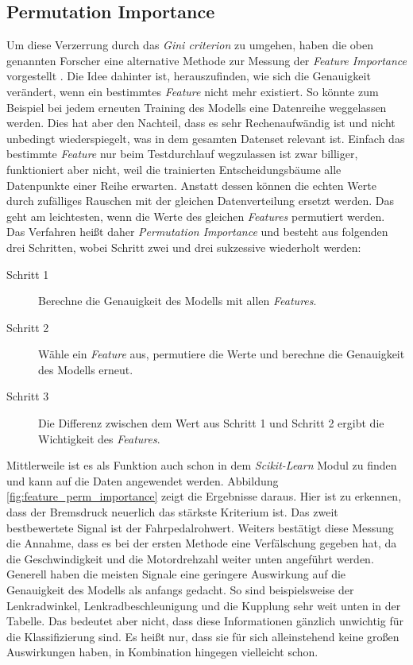 \subsection{Permutation Importance}
Um diese Verzerrung durch das \textit{Gini criterion} zu umgehen, haben die oben genannten Forscher eine alternative Methode zur Messung der \textit{Feature Importance} vorgestellt \cite{Strobl2007}. Die Idee dahinter ist, herauszufinden, wie sich die Genauigkeit verändert, wenn ein bestimmtes \textit{Feature} nicht mehr existiert. So könnte zum Beispiel bei jedem erneuten Training des Modells eine Datenreihe weggelassen werden. Dies hat aber den Nachteil, dass es sehr Rechenaufwändig ist und nicht unbedingt wiederspiegelt, was in dem gesamten Datenset relevant ist. Einfach das bestimmte \textit{Feature} nur beim Testdurchlauf wegzulassen ist zwar billiger, funktioniert aber nicht, weil die trainierten Entscheidungsbäume alle Datenpunkte einer Reihe erwarten. Anstatt dessen können die echten Werte durch zufälliges Rauschen mit der gleichen Datenverteilung ersetzt werden. Das geht am leichtesten, wenn die Werte des gleichen \textit{Features} permutiert werden. Das Verfahren heißt daher \textit{Permutation Importance} und besteht aus folgenden drei Schritten, wobei Schritt zwei und drei sukzessive wiederholt werden:

\begin{description}
	\item[Schritt 1] Berechne die Genauigkeit des Modells mit allen \textit{Features}.
	\item[Schritt 2] Wähle ein \textit{Feature} aus, permutiere die Werte und berechne die Genauigkeit des Modells erneut.
	\item[Schritt 3] Die Differenz zwischen dem Wert aus Schritt 1 und Schritt 2 ergibt die Wichtigkeit des \textit{Features}.
\end{description}

Mittlerweile ist es als Funktion auch schon in dem \textit{Scikit-Learn} Modul zu finden und kann auf die Daten angewendet werden. Abbildung \ref{fig:feature_perm_importance} zeigt die Ergebnisse daraus. Hier ist zu erkennen, dass der Bremsdruck neuerlich das stärkste Kriterium ist. Das zweit bestbewertete Signal ist der Fahrpedalrohwert. Weiters bestätigt diese Messung die Annahme, dass es bei der ersten Methode eine Verfälschung gegeben hat, da die Geschwindigkeit und die Motordrehzahl weiter unten angeführt werden. Generell haben die meisten Signale eine geringere Auswirkung auf die Genauigkeit des Modells als anfangs gedacht. So sind beispielsweise der Lenkradwinkel, Lenkradbeschleunigung und die Kupplung sehr weit unten in der Tabelle. Das bedeutet aber nicht, dass diese Informationen gänzlich unwichtig für die Klassifizierung sind. Es heißt nur, dass sie für sich alleinstehend keine großen Auswirkungen haben, in Kombination hingegen vielleicht schon.

